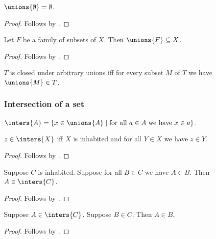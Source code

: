 \begin{proposition}\label{unions_emptyset}
    $\unions{\emptyset} = \emptyset$.
\end{proposition}
\begin{proof}
    Follows by .
\end{proof}

\begin{proposition}\label{unions_family}
    Let $F$ be a family of subsets of $X$.
    Then $\unions{F}\subseteq X$.
\end{proposition}
\begin{proof}
    Follows by .
\end{proof}

\begin{abbreviation}\label{closedunderunions}
    $T$ is closed under arbitrary unions
    iff for every subset $M$ of $T$ we have $\unions{M}\in T$.
\end{abbreviation}

\subsubsection{Intersection of a set}

\begin{definition}\label{inters}
    $\inters{A} = \{ x\in\unions{A}\mid \text{for all $a\in A$ we have $x\in a$} \}$.
\end{definition}

\begin{proposition}\label{inters_iff_forall}
    $z\in\inters{X}$ iff $X$ is inhabited and for all $Y\in X$ we have $z\in Y$.
\end{proposition}
\begin{proof}
    Follows by .
\end{proof}

\begin{proposition}%
\label{inters_intro}
    Suppose $C$ is inhabited.
    Suppose for all $B\in C$ we have $A\in B$.
    Then $A\in\inters{C}$.
\end{proposition}
\begin{proof}
    Follows by .
\end{proof}

\begin{proposition}\label{inters_destr}
    Suppose $A\in\inters{C}$.
    Suppose $B\in C$.
    Then $A\in B$.
\end{proposition}
\begin{proof}
    Follows by .
\end{proof}

